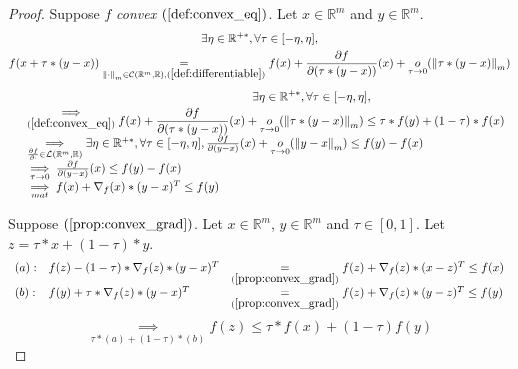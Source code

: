 \documentclass[11pt,en]{elegantpaper}
\newcommand{\norm}[1]{\left\lVert#1\right\rVert}
\newcommand{\Real}{\mathbb{R}}
\begin{document}
\begin{proof}
  Suppose $f$ \textit{convex} $(\ref{def:convex_eq})$. Let $x \in \Real^m$ and $y \in \Real^m$. \begin{equation*}
    \begin{gathered}
      \exists \eta \in \Real^{+*}, \forall \tau \in [-\eta,\eta], \\
      f(x + \tau * (y - x)) \underset{\norm{\cdot}_m \in \mathcal{C}(\Real^m,\Real),(\ref{def:differentiable})}{=}
        f(x) + \frac{\partial f}{\partial (\tau * (y - x))}(x) + \underset{\tau \to 0}o(\norm{\tau * (y - x)}_m)
    \end{gathered}
  \end{equation*}
  \begin{equation*}
    \begin{array}{ll}
      & \underset{(\ref{def:convex_eq})}{\implies}
        \begin{gathered}
          \exists \eta \in \Real^{+*}, \forall \tau \in [-\eta,\eta], \\
          f(x) + \frac{\partial f}{\partial (\tau * (y - x))}(x) + \underset{\tau \to 0}o(\norm{\tau * (y - x)}_m)
          \leq \tau * f(y) + (1 - \tau) * f(x)
        \end{gathered} \\
      & \underset{\frac{\partial f}{\partial \cdot} \in \mathcal{L}(\Real^m,\Real)}{\implies}
        \exists \eta \in \Real^{+*}, \forall \tau \in [-\eta,\eta],
        \frac{\partial f}{\partial (y - x)}(x) + \underset{\tau \to 0}o(\norm{y - x}_m)
        \leq f(y) - f(x) \\
      & \underset{\tau \to 0}{\implies}
        \frac{\partial f}{\partial (y - x)}(x) \leq f(y) - f(x) \\
      & \underset{mat}{\implies}
        f(x) + \nabla_f(x) * (y - x)^T \leq f(y)
    \end{array}
  \end{equation*} \par \par

  Suppose $(\ref{prop:convex_grad})$. Let $x \in \Real^m$, $y \in \Real^m$ and $\tau \in [0,1]$. Let $z = \tau * x + (1 - \tau) * y$.
  \begin{equation*}
    \begin{array}{lll}
      (a) : & f(z) - (1 - \tau) * \nabla_f(z) * (y - x)^T & \underset{(\ref{prop:convex_grad})}{=} f(z) + \nabla_f(z) * (x - z)^T \leq f(x) \\
      (b) : & f(y) + \tau * \nabla_f(z) * (y - x)^T & \underset{(\ref{prop:convex_grad})}{=} f(z) + \nabla_f(z) * (y - z)^T \leq f(y)
    \end{array}
  \end{equation*}
  \begin{equation*}
    \underset{\tau * (a) + (1 - \tau) * (b)}{\implies} f(z) \leq \tau * f(x) + (1 - \tau) f(y)
  \end{equation*}
\end{proof}
\end{document}
